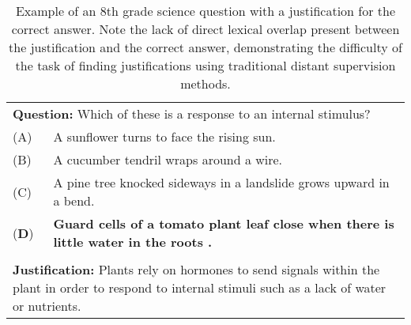 \begin{table}[t]
\begin{center}
\begin{tabularx}{\linewidth}{p{1cm}p{13cm}}
\multicolumn{2}{p{15cm}}{\textbf{Question:} Which of these is a response to an internal stimulus?} \\
 (A) & A sunflower turns to face the rising sun. \\
 (B) & A cucumber tendril wraps around a wire. \\
 (C) &  A pine tree knocked sideways in a landslide grows upward in a bend. \\
 (\textbf{D}) &\textbf{Guard cells of a tomato plant leaf close when there is little water in the roots .} \\
\\
\multicolumn{2}{p{15cm}}{\textbf{Justification:} 
Plants rely on hormones to send signals within the plant in order to respond to internal stimuli such as a lack of water or nutrients. } \\
\end{tabularx}

\caption{{  Example of an 8th grade science question with a justification for the correct answer.  Note the lack of direct lexical overlap present between the justification and the correct answer, demonstrating the difficulty of the task of finding justifications using traditional distant supervision methods. }}

\label{tab:question_example}
\end{center}
\end{table}

